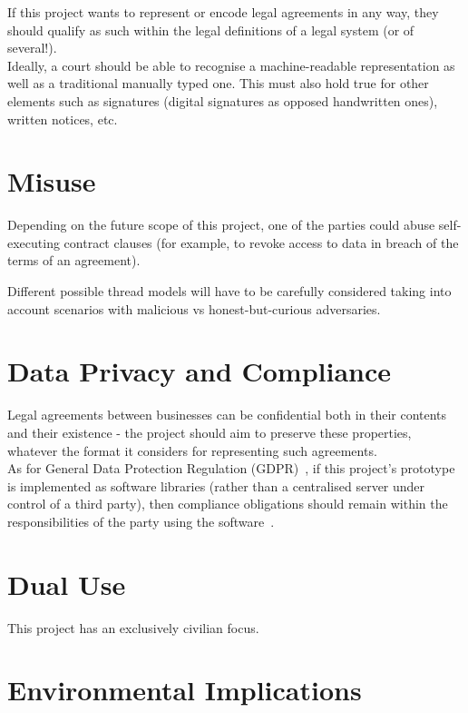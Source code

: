 If this project wants to represent or encode legal agreements in any way, they should qualify as such within the legal
definitions of a legal system (or of several!).\\

Ideally, a court should be able to recognise a machine-readable representation as well as a traditional manually typed
one.
This must also hold true for other elements such as signatures (digital signatures as opposed handwritten ones),
written notices, etc.


\section{Misuse}\label{sec:misuse}

Depending on the future scope of this project, one of the parties could abuse self-executing contract clauses (for
example, to revoke access to data in breach of the terms of an agreement).

Different possible thread models will have to be carefully considered taking into account scenarios with
malicious vs honest-but-curious adversaries.


\section{Data Privacy and Compliance}\label{sec:data-privacy-compliance}

Legal agreements between businesses can be confidential both in their contents and their existence - the project should
aim to preserve these properties, whatever the format it considers for representing such agreements.\\

As for General Data Protection Regulation (GDPR)~\cite{gdprInfo}, if this project's prototype is implemented as software
libraries (rather than a centralised server under control of a third party), then compliance obligations should remain
within the responsibilities of the party using the software~\citeTODO.


\section{Dual Use}\label{sec:dual-use}

This project has an exclusively civilian focus.


\section{Environmental Implications}\label{sec:environmental-implications}

